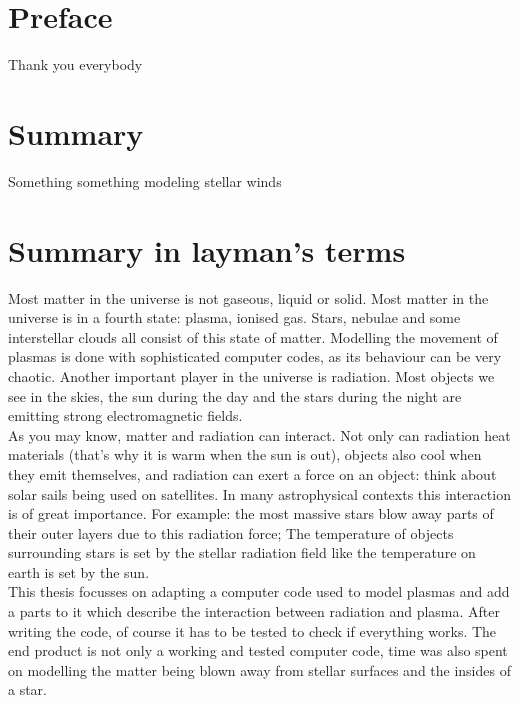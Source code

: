 \chapter*{Preface}
Thank you everybody
\chapter*{Summary}
Something something modeling stellar winds
\chapter*{Summary in layman's terms}
Most matter in the universe is not gaseous, liquid or solid. Most matter in the universe is in a fourth state: plasma, ionised gas. Stars, nebulae and some interstellar clouds all consist of this state of matter. Modelling the movement of plasmas is done with sophisticated computer codes, as its behaviour can be very chaotic. Another important player in the universe is radiation. Most objects we see in the skies, the sun during the day and the stars during the night are emitting strong electromagnetic fields.\\

As you may know, matter and radiation can interact. Not only can radiation heat materials (that's why it is warm when the sun is out), objects also cool when they emit themselves, and radiation can exert a force on an object: think about solar sails being used on satellites. In many astrophysical contexts this interaction is of great importance. For example: the most massive stars blow away parts of their outer layers due to this radiation force; The temperature of objects surrounding stars is set by the stellar radiation field like the temperature on earth is set by the sun.\\

This thesis focusses on adapting a computer code used to model plasmas and add a parts to it which describe the interaction between radiation and plasma. After writing the code, of course it has to be tested to check if everything works. The end product is not only a working and tested computer code, time was also spent on modelling the matter being blown away from stellar surfaces and the insides of a star.  